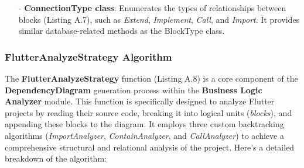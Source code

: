 \begin{itemize}
    \item[-] \textbf{ConnectionType class}: Enumerates the types of relationships between blocks (Listing A.7), such as \textit{Extend}, \textit{Implement}, \textit{Call}, and \textit{Import}. It provides similar database-related methods as the BlockType class.
\end{itemize}

\subsubsection{FlutterAnalyzeStrategy Algorithm}

The \textbf{FlutterAnalyzeStrategy} function (Listing A.8) is a core component of the \textbf{DependencyDiagram} generation process within the \textbf{Business Logic Analyzer} module. This function is specifically designed to analyze Flutter projects by reading their source code, breaking it into logical units (\textit{blocks}), and appending these blocks to the diagram. It employs three custom backtracking algorithms (\textit{ImportAnalyzer}, \textit{ContainAnalyzer}, and \textit{CallAnalyzer}) to achieve a comprehensive structural and relational analysis of the project. Here's a detailed breakdown of the algorithm:

